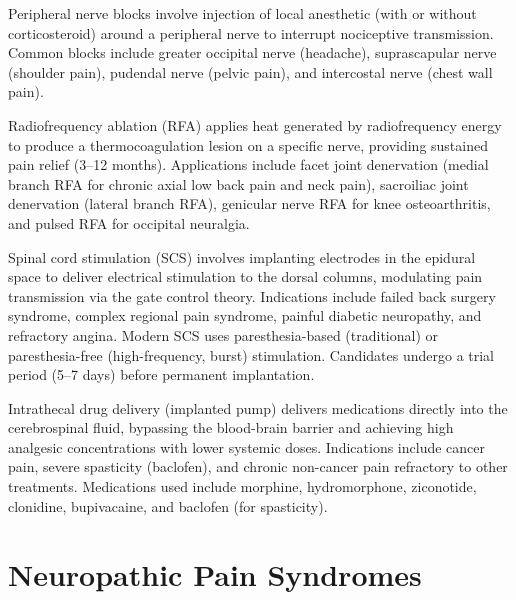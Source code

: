 Peripheral nerve blocks involve injection of local anesthetic (with or without corticosteroid) around a peripheral nerve to interrupt nociceptive transmission. Common blocks include greater occipital nerve (headache), suprascapular nerve (shoulder pain), pudendal nerve (pelvic pain), and intercostal nerve (chest wall pain).

Radiofrequency ablation (RFA) applies heat generated by radiofrequency energy to produce a thermocoagulation lesion on a specific nerve, providing sustained pain relief (3--12 months). Applications include facet joint denervation (medial branch RFA for chronic axial low back pain and neck pain), sacroiliac joint denervation (lateral branch RFA), genicular nerve RFA for knee osteoarthritis, and pulsed RFA for occipital neuralgia.

Spinal cord stimulation (SCS) involves implanting electrodes in the epidural space to deliver electrical stimulation to the dorsal columns, modulating pain transmission via the gate control theory. Indications include failed back surgery syndrome, complex regional pain syndrome, painful diabetic neuropathy, and refractory angina. Modern SCS uses paresthesia-based (traditional) or paresthesia-free (high-frequency, burst) stimulation. Candidates undergo a trial period (5--7 days) before permanent implantation.

Intrathecal drug delivery (implanted pump) delivers medications directly into the cerebrospinal fluid, bypassing the blood-brain barrier and achieving high analgesic concentrations with lower systemic doses. Indications include cancer pain, severe spasticity (baclofen), and chronic non-cancer pain refractory to other treatments. Medications used include morphine, hydromorphone, ziconotide, clonidine, bupivacaine, and baclofen (for spasticity).

\section{Neuropathic Pain Syndromes}





